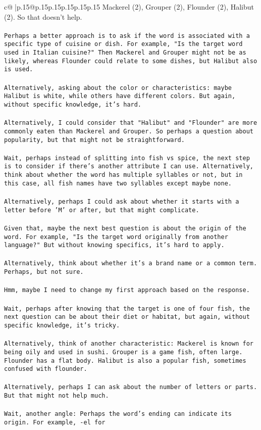 \documentclass{article}
\begin{document}
{\begin{supertabular}{c@{$\;$}|p{.15\linewidth}@{}p{.15\linewidth}p{.15\linewidth}p{.15\linewidth}p{.15\linewidth}p{.15\linewidth}}
{{{Mackerel (2), Grouper (2), Flounder (2), Halibut (2). So that doesn't help.\\ \tt \\ \tt Perhaps a better approach is to ask if the word is associated with a specific type of cuisine or dish. For example, "Is the target word used in Italian cuisine?" Then Mackerel and Grouper might not be as likely, whereas Flounder could relate to some dishes, but Halibut also is used.\\ \tt \\ \tt Alternatively, asking about the color or characteristics: maybe Halibut is white, while others have different colors. But again, without specific knowledge, it's hard.\\ \tt \\ \tt Alternatively, I could consider that "Halibut" and "Flounder" are more commonly eaten than Mackerel and Grouper. So perhaps a question about popularity, but that might not be straightforward.\\ \tt \\ \tt Wait, perhaps instead of splitting into fish vs spice, the next step is to consider if there's another attribute I can use. Alternatively, think about whether the word has multiple syllables or not, but in this case, all fish names have two syllables except maybe none.\\ \tt \\ \tt Alternatively, perhaps I could ask about whether it starts with a letter before 'M' or after, but that might complicate.\\ \tt \\ \tt Given that, maybe the next best question is about the origin of the word. For example, "Is the target word originally from another language?" But without knowing specifics, it's hard to apply.\\ \tt \\ \tt Alternatively, think about whether it's a brand name or a common term. Perhaps, but not sure.\\ \tt \\ \tt Hmm, maybe I need to change my first approach based on the response.\\ \tt \\ \tt Wait, perhaps after knowing that the target is one of four fish, the next question can be about their diet or habitat, but again, without specific knowledge, it's tricky.\\ \tt \\ \tt Alternatively, think of another characteristic: Mackerel is known for being oily and used in sushi. Grouper is a game fish, often large. Flounder has a flat body. Halibut is also a popular fish, sometimes confused with flounder.\\ \tt \\ \tt Alternatively, perhaps I can ask about the number of letters or parts. But that might not help much.\\ \tt \\ \tt Wait, another angle: Perhaps the word's ending can indicate its origin. For example, -el for }}}
\end{supertabular}}
\end{document}

